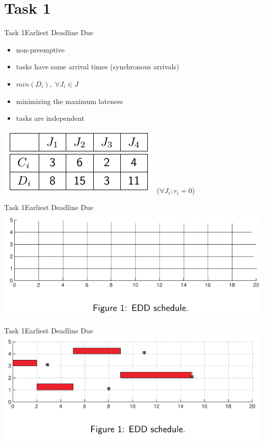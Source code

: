 
\section{Task 1}

\setcounter{task}{1}

\begin{frame}{Task 1}{Earliest Deadline Due}
  \begin{itemize}
    \item \alert{non-preemptive}
    \item tasks have \alert{same arrival times} (synchronous arrivals)
    \item $min(D_i),\;\forall J_i \in J$
    \item \alert{minimizing} the \alert{maximum lateness}
    \item tasks are \alert{independent}
  \end{itemize}
  \centering
  \includegraphics[height=0.2\paperheight]{./figures/1_tab.png}
  ($\forall J_i: r_i = 0$)
\end{frame}

\begin{frame}{Task 1}{Earliest Deadline Due}
  \includegraphics[width=\textwidth]{./figures/1_empty.png}
\end{frame}

\begin{frame}{Task 1}{Earliest Deadline Due}
  \includegraphics[width=\textwidth]{./figures/1_sol.png}
\end{frame}
